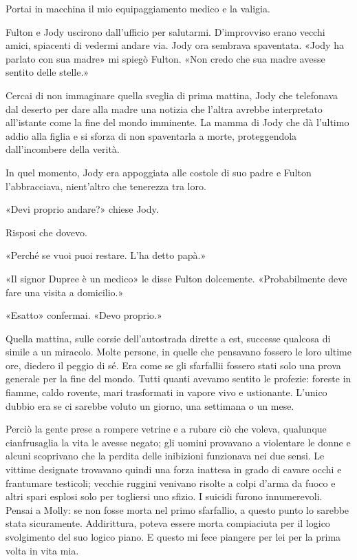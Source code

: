 Portai in macchina il mio equipaggiamento medico e la valigia.

Fulton e Jody uscirono dall'ufficio per salutarmi. D'improvviso erano
vecchi amici, spiacenti di vedermi andare via. Jody ora sembrava
spaventata. «Jody ha parlato con sua madre» mi spiegò Fulton. «Non credo
che sua madre avesse sentito delle stelle.»

Cercai di non immaginare quella sveglia di prima mattina, Jody che
telefonava dal deserto per dare alla madre una notizia che l'altra
avrebbe interpretato all'istante come la fine del mondo imminente. La
mamma di Jody che dà l'ultimo addio alla figlia e si sforza di non
spaventarla a morte, proteggendola dall'incombere della verità.

In quel momento, Jody era appoggiata alle costole di suo padre e Fulton
l'abbracciava, nient'altro che tenerezza tra loro.

«Devi proprio andare?» chiese Jody.

Risposi che dovevo.

«Perché se vuoi puoi restare. L'ha detto papà.»

«Il signor Dupree è un medico» le disse Fulton dolcemente.
«Probabilmente deve fare una visita a domicilio.»

«Esatto» confermai. «Devo proprio.»

\separatorefiori

Quella mattina, sulle corsie dell'autostrada dirette a est, successe
qualcosa di simile a un miracolo. Molte persone, in quelle che pensavano
fossero le loro ultime ore, diedero il peggio di sé. Era come se gli
sfarfallii fossero stati solo una prova generale per la fine del mondo.
Tutti quanti avevamo sentito le profezie: foreste in fiamme, caldo
rovente, mari trasformati in vapore vivo e ustionante. L'unico dubbio
era se ci sarebbe voluto un giorno, una settimana o un mese.

Perciò la gente prese a rompere vetrine e a rubare ciò che voleva,
qualunque cianfrusaglia la vita le avesse negato; gli uomini provavano a
violentare le donne e alcuni scoprivano che la perdita delle inibizioni
funzionava nei due sensi. Le vittime designate trovavano quindi una
forza inattesa in grado di cavare occhi e frantumare testicoli; vecchie
ruggini venivano risolte a colpi d'arma da fuoco e altri spari esplosi
solo per togliersi uno sfizio. I suicidi furono innumerevoli. Pensai a
Molly: se non fosse morta nel primo sfarfallio, a questo punto lo
sarebbe stata sicuramente. Addirittura, poteva essere morta compiaciuta
per il logico svolgimento del suo logico piano. E questo mi fece
piangere per lei per la prima volta in vita mia.


